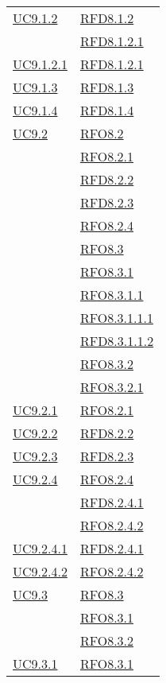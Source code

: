 \begin{longtable}{|>{\centering}m{5cm}|m{5cm}<{\centering}|}
\hyperref[UC9.1.2]{UC9.1.2} & \hyperlink{RFD8.1.2}{RFD8.1.2}\\
& \hyperlink{RFD8.1.2.1}{RFD8.1.2.1}\\ \hline
\hyperref[UC9.1.2.1]{UC9.1.2.1} & \hyperlink{RFD8.1.2.1}{RFD8.1.2.1}\\ \hline
\hyperref[UC9.1.3]{UC9.1.3} & \hyperlink{RFD8.1.3}{RFD8.1.3}\\ \hline
\hyperref[UC9.1.4]{UC9.1.4} & \hyperlink{RFD8.1.4}{RFD8.1.4}\\ \hline
\hyperref[UC9.2]{UC9.2} & \hyperlink{RFO8.2}{RFO8.2}\\
& \hyperlink{RFO8.2.1}{RFO8.2.1}\\
& \hyperlink{RFD8.2.2}{RFD8.2.2}\\
& \hyperlink{RFD8.2.3}{RFD8.2.3}\\
& \hyperlink{RFO8.2.4}{RFO8.2.4}\\
& \hyperlink{RFO8.3}{RFO8.3}\\
& \hyperlink{RFO8.3.1}{RFO8.3.1}\\
& \hyperlink{RFO8.3.1.1}{RFO8.3.1.1}\\
& \hyperlink{RFO8.3.1.1.1}{RFO8.3.1.1.1}\\
& \hyperlink{RFD8.3.1.1.2}{RFD8.3.1.1.2}\\
& \hyperlink{RFO8.3.2}{RFO8.3.2}\\
& \hyperlink{RFO8.3.2.1}{RFO8.3.2.1}\\ \hline
\hyperref[UC9.2.1]{UC9.2.1} & \hyperlink{RFO8.2.1}{RFO8.2.1}\\ \hline
\hyperref[UC9.2.2]{UC9.2.2} & \hyperlink{RFD8.2.2}{RFD8.2.2}\\ \hline
\hyperref[UC9.2.3]{UC9.2.3} & \hyperlink{RFD8.2.3}{RFD8.2.3}\\ \hline
\hyperref[UC9.2.4]{UC9.2.4} & \hyperlink{RFO8.2.4}{RFO8.2.4}\\
& \hyperlink{RFD8.2.4.1}{RFD8.2.4.1}\\
& \hyperlink{RFO8.2.4.2}{RFO8.2.4.2}\\ \hline
\hyperref[UC9.2.4.1]{UC9.2.4.1} & \hyperlink{RFD8.2.4.1}{RFD8.2.4.1}\\ \hline
\hyperref[UC9.2.4.2]{UC9.2.4.2} & \hyperlink{RFO8.2.4.2}{RFO8.2.4.2}\\ \hline
\hyperref[UC9.3]{UC9.3} & \hyperlink{RFO8.3}{RFO8.3}\\
& \hyperlink{RFO8.3.1}{RFO8.3.1}\\
& \hyperlink{RFO8.3.2}{RFO8.3.2}\\ \hline
\hyperref[UC9.3.1]{UC9.3.1} & \hyperlink{RFO8.3.1}{RFO8.3.1}\\

\end{longtable}
